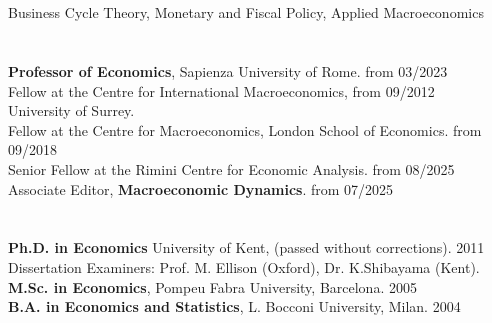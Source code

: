 \documentclass[margin, 11pt]{res} %
\begin{document}
\begin{resume}

\section{}
Business Cycle Theory, Monetary and Fiscal Policy, Applied Macroeconomics\\


\section{}
\textbf{Professor of Economics}, Sapienza University of Rome. \hfill  from 03/2023\\
Fellow at the Centre for International Macroeconomics,  \hfill from 09/2012\\
University of Surrey.\\
Fellow at the Centre for Macroeconomics, London School of Economics. \hfill from 09/2018\\
Senior Fellow at the Rimini Centre for Economic Analysis. \hfill from 08/2025\\
Associate Editor, \textbf{Macroeconomic Dynamics}. \hfill from 07/2025\\

\section{}
\textbf{Ph.D. in Economics} University of Kent,  (passed without corrections). \hfill 2011 \\
\hspace*{5mm}Dissertation Examiners:  Prof. M. Ellison (Oxford), Dr. K.Shibayama (Kent).\\
\textbf{M.Sc. in Economics}, Pompeu Fabra University, Barcelona.    \hfill 2005\\
\textbf{B.A. in Economics and Statistics},  L. Bocconi University, Milan.   \hfill 2004


\end{resume}
\end{document}

